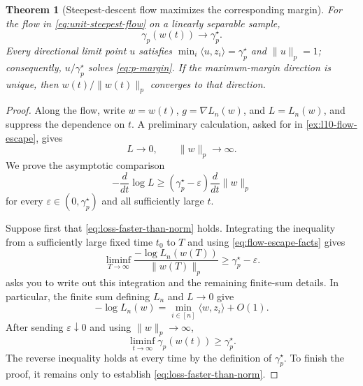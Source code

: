 \documentclass[11pt,twoside]{article}
\newtheorem{theorem}{Theorem}[section]
\theoremstyle{definition}
\theoremstyle{remark}
\begin{document}
\begin{theorem}[Steepest-descent flow maximizes the corresponding margin]
\label{thm:margin-geometry}
For the flow in \cref{eq:unit-steepest-flow} on a linearly separable sample,
\[
 \gamma_p(w(t))\longrightarrow\gamma_p^\star.
\]
Every directional limit point $u$ satisfies
$\min_i\langle u,z_i\rangle=\gamma_p^\star$ and $\|u\|_p=1$; consequently,
$u/\gamma_p^\star$ solves \cref{eq:p-margin}. If the maximum-margin direction
is unique, then
$w(t)/\|w(t)\|_p$ converges to that direction.
\end{theorem}

\begin{proof}
Along the flow, write $w=w(t)$, $g=\nabla L_n(w)$, and $L=L_n(w)$, and
suppress the dependence on $t$. A preliminary calculation, asked for in
\cref{ex:l10-flow-escape}, gives
\begin{equation}
 L\longrightarrow0, \qquad \|w\|_p\longrightarrow\infty.
 \label{eq:flow-escape-facts}
\end{equation}
We prove the asymptotic comparison
\begin{equation}
 -\frac{d}{dt}\log L \ge (\gamma_p^\star-\varepsilon)\frac{d}{dt}\|w\|_p
 \label{eq:loss-faster-than-norm}
\end{equation}
for every $\varepsilon\in(0,\gamma_p^\star)$ and all sufficiently large $t$.

Suppose first that \cref{eq:loss-faster-than-norm} holds. Integrating the
inequality from a sufficiently large fixed time $t_0$ to $T$ and using
\cref{eq:flow-escape-facts} gives
\[
 \liminf_{T\to\infty}\frac{-\log L_n(w(T))}{\|w(T)\|_p}\ge\gamma_p^\star-\varepsilon.
\]
 asks you to write out this integration and
the remaining finite-sum details. In particular, the finite sum defining
$L_n$ and $L\to0$ give
\[
 -\log L_n(w)=\min_{i\in[n]}\langle w,z_i\rangle+O(1).
\]
After sending $\varepsilon\downarrow0$ and using $\|w\|_p\to\infty$,
\[
 \liminf_{t\to\infty}\gamma_p(w(t))\ge\gamma_p^\star.
\]
The reverse inequality holds at every time by the definition of
$\gamma_p^\star$. To finish the proof, it remains only to establish
\cref{eq:loss-faster-than-norm}.


\end{proof}
\end{document}

